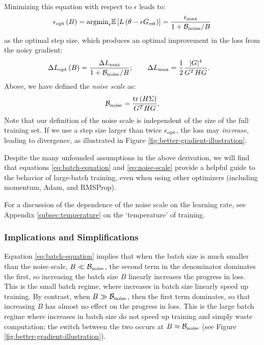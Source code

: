 \documentclass[english]{article}
\begin{document}
Minimizing this equation with respect to $\epsilon$ leads to:
\begin{equation}
\epsilon_{\mathrm{opt}}\left(B\right)={\rm argmin}_{\epsilon}\mathbb{E}\left[L\left(\theta-\epsilon G_{{\rm est}}\right)\right]=\frac{\epsilon_{{\rm max}}}{1+\mathcal{B}_{{\rm noise}}/{B}}\label{eq:OptimalStepwithNoise}
\end{equation}
as the optimal step size, which produces an optimal improvement in the loss from the noisy gradient:
\begin{align}
\Delta L_{\mathrm{opt}}\left(B\right) & =\frac{\Delta L_{{\rm max}}}{1+\mathcal{B}_{{\rm noise}}/{B}};\qquad\Delta L_{{\rm max}}=\frac{1}{2}\frac{|G|^{4}}{G^{T}HG}.\label{eq:batch-equation}
\end{align}
Above, we have defined the \textit{noise scale }as:
\begin{equation}
\mathcal{B}_{{\rm noise}}=\frac{{\rm tr}\left(H\Sigma\right)}{G^{T}HG},\label{eq:noise-scale}
\end{equation}
Note that our definition of the noise scale is independent of the size of the full training set.  If we use a step size larger than twice $\epsilon_{{\rm opt}}$, the loss may \emph{increase}, leading to divergence, as illustrated in Figure \ref{fig:better-gradient-illustration}.

Despite the many unfounded assumptions in the above derivation, we will find that equations \ref{eq:batch-equation} and \ref{eq:noise-scale} provide a helpful guide to the behavior of large-batch training, even when using other optimizers (including momentum, Adam, and RMSProp).

For a discussion of the dependence of the noise scale on the learning rate, see  Appendix \ref{subsec:temperature} on the `temperature' of training.

\subsubsection*{Implications and Simplifications}

Equation \ref{eq:batch-equation} implies that when the batch size is much smaller than the noise scale, $B\ll\mathcal{B}_{{\rm noise}}$, the second term in the denominator dominates the first, so increasing the batch size $B$ linearly increases the progress in loss. This is the small batch regime, where increases in batch size linearly speed up training. By contrast, when $B\gg\mathcal{B}_{{\rm noise}}$, then the first term dominates, so that increasing $B$ has almost no effect on the progress in loss. This is the large batch regime where increases in batch size do not speed up training and simply waste computation; the switch between the two occurs at $B\approx\mathcal{B}_{{\rm noise}}$ (see Figure \ref{fig:better-gradient-illustration}).
\end{document}
